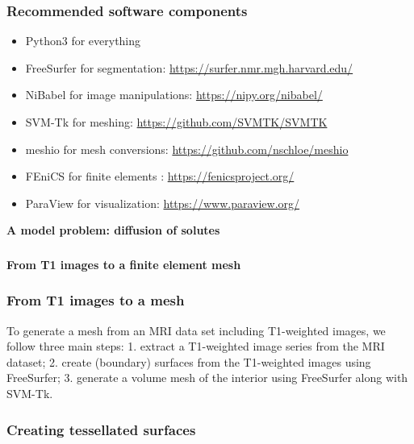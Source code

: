 \documentclass[mathserif, aspectratio=169]{beamer}
\newcommand{\mysection}[1]{\begin{frame} \begin{center} \vspace{3em} \textbf{#1} \end{center} \end{frame}}
\begin{document}
\begin{frame}
\frametitle{Recommended software components}

\begin{itemize}
\item
  Python3 for everything
\item
  FreeSurfer for segmentation: \href{https://surfer.nmr.mgh.harvard.edu/}{https://surfer.nmr.mgh.harvard.edu/}
\item
  NiBabel for image manipulations: \href{https://nipy.org/nibabel/}{https://nipy.org/nibabel/}
\item
  SVM-Tk for meshing: \href{https://github.com/SVMTK/SVMTK}{https://github.com/SVMTK/SVMTK}
\item
  meshio for mesh conversions: \href{https://github.com/nschloe/meshio}{https://github.com/nschloe/meshio}
\item
  FEniCS for finite elements : \href{https://fenicsproject.org/}{https://fenicsproject.org/}
\item
  ParaView for visualization: \href{https://www.paraview.org/}{https://www.paraview.org/}
\end{itemize}

\end{frame}

%
% 
%

\mysection{A model problem: diffusion of solutes}

\begin{frame}
\frametitle{}
\end{frame}

\mysection{From T1 images to a finite element mesh}

\begin{frame}
\frametitle{From T1 images to a mesh}

To generate a mesh from an MRI data set including T1-weighted images, we
follow three main steps:
1. extract a T1-weighted image series from the MRI dataset;
2. create (boundary) surfaces from the T1-weighted images using FreeSurfer;
3. generate a volume mesh of the interior using FreeSurfer along with SVM-Tk.
\end{frame}


\begin{frame}
\frametitle{Creating tessellated surfaces}
\end{frame}
\end{document}
